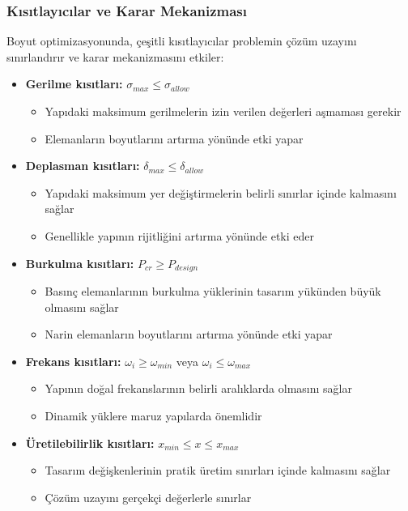 \subsubsection{Kısıtlayıcılar ve Karar Mekanizması}
Boyut optimizasyonunda, çeşitli kısıtlayıcılar problemin çözüm uzayını sınırlandırır ve karar mekanizmasını etkiler:

\begin{itemize}
    \item \textbf{Gerilme kısıtları:} $\sigma_{max} \leq \sigma_{allow}$
    \begin{itemize}
        \item Yapıdaki maksimum gerilmelerin izin verilen değerleri aşmaması gerekir
        \item Elemanların boyutlarını artırma yönünde etki yapar
    \end{itemize}
    
    \item \textbf{Deplasman kısıtları:} $\delta_{max} \leq \delta_{allow}$
    \begin{itemize}
        \item Yapıdaki maksimum yer değiştirmelerin belirli sınırlar içinde kalmasını sağlar
        \item Genellikle yapının rijitliğini artırma yönünde etki eder
    \end{itemize}
    
    \item \textbf{Burkulma kısıtları:} $P_{cr} \geq P_{design}$
    \begin{itemize}
        \item Basınç elemanlarının burkulma yüklerinin tasarım yükünden büyük olmasını sağlar
        \item Narin elemanların boyutlarını artırma yönünde etki yapar
    \end{itemize}
    
    \item \textbf{Frekans kısıtları:} $\omega_i \geq \omega_{min}$ veya $\omega_i \leq \omega_{max}$
    \begin{itemize}
        \item Yapının doğal frekanslarının belirli aralıklarda olmasını sağlar
        \item Dinamik yüklere maruz yapılarda önemlidir
    \end{itemize}
    
    \item \textbf{Üretilebilirlik kısıtları:} $x_{min} \leq x \leq x_{max}$
    \begin{itemize}
        \item Tasarım değişkenlerinin pratik üretim sınırları içinde kalmasını sağlar
        \item Çözüm uzayını gerçekçi değerlerle sınırlar
    \end{itemize}
    

\end{itemize}
